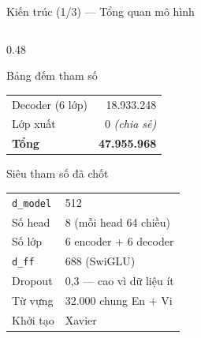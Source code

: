 \documentclass[aspectratio=169, 10pt]{beamer}
\newcommand{\bangchat}{\setlength{\tabcolsep}{3pt}}
\begin{document}
\begin{frame}[shrink=10]{Kiến trúc (1/3) — Tổng quan mô hình}
\begin{columns}[T]
\begin{column}{0.48\textwidth}
\begin{block}{Bảng đếm tham số}
\begin{tabular}{@{}lr@{}}
          Decoder (6 lớp)        & 18.933.248 \\
          Lớp xuất               & 0 \textit{(chia sẻ)} \\
          \midrule
          \textbf{Tổng}          & \textbf{47.955.968} \\
          \bottomrule
        \end{tabular}
      \end{block}
      \begin{block}{Siêu tham số đã chốt}
        \scriptsize\bangchat
        \begin{tabular}{@{}ll@{}}
          \toprule
          \texttt{d\_model} & 512 \\
          Số head           & 8 (mỗi head 64 chiều) \\
          Số lớp            & 6 encoder + 6 decoder \\
          \texttt{d\_ff}    & 688 (SwiGLU) \\
          Dropout           & 0{,}3 — cao vì dữ liệu ít \\
          Từ vựng           & 32.000 chung En + Vi \\
          Khởi tạo          & Xavier \\
          \bottomrule
        \end{tabular}
      \end{block}
    \end{column}
  \end{columns}
\end{frame}
\end{document}
